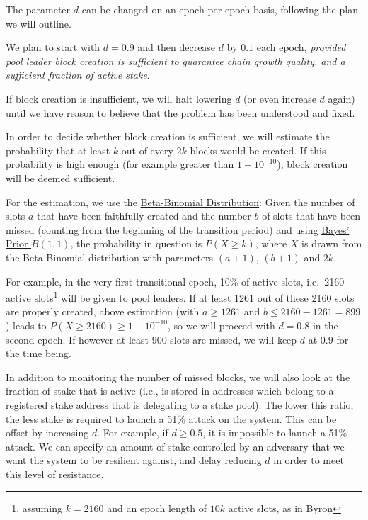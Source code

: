 \documentclass[11pt,a4paper,dvipsnames,twosided]{article}
\begin{document}
The parameter \(d\) can be changed on an epoch-per-epoch basis, following
the plan we will outline.

We plan to start with \(d=0.9\) and then decrease \(d\) by \(0.1\) each
epoch, \emph{provided pool leader block creation is sufficient to
guarantee chain growth quality, and a sufficient fraction of active
stake}.

If block creation is insufficient, we will halt lowering \(d\) (or even
increase \(d\) again) until we have reason to believe that the problem
has been understood and fixed.

In order to decide whether block creation is sufficient, we will
estimate the probability that at least \(k\) out of every \(2k\) blocks
would be created. If this probability is high enough (for example
greater than \(1 - 10^{-10}\)), block creation will be deemed
sufficient.

For the estimation, we use the
\href{https://en.wikipedia.org/wiki/Beta-binomial_distribution}{Beta-Binomial
Distribution}: Given the number of slots \(a\) that have been faithfully
created and the number \(b\) of slots that have been missed (counting
from the beginning of the transition period) and using
\href{https://en.wikipedia.org/wiki/Beta_distribution\#Bayes'_prior_probability_(Beta(1,1))}{Bayes'
Prior \(B(1,1)\)}, the probability in question is \(P(X\geq k)\),
where \(X\) is drawn from the Beta-Binomial distribution with parameters
\((a + 1)\), \((b + 1)\) and \(2k\).

For example, in the very first transitional epoch, 10\% of active slots,
i.e.~2160 active slots\footnote{assuming \(k=2160\) and an epoch length of
  \(10k\) active slots, as in Byron} will be given to pool leaders. If at least
1261 out of these 2160 slots are properly created, above estimation (with
\(a\geq 1261\) and \(b\leq 2160-1261=899\)) leads to \(P(X\geq 2160)\geq
1-10^{-10}\), so we will proceed with \(d=0.8\) in the second epoch. If however
at least 900 slots are missed, we will keep \(d\) at \(0.9\) for the time being.

In addition to monitoring the number of missed blocks, we will also look
at the fraction of stake that is active (i.e., is stored in addresses
which belong to a registered stake address that is delegating to a stake
pool). The lower this ratio, the less stake is required to launch a 51\%
attack on the system. This can be offset by increasing \(d\). For
example, if \(d \geq 0.5\), it is impossible to launch a 51\% attack. We
can specify an amount of stake controlled by an adversary that we want
the system to be resilient against, and delay reducing \(d\) in order to
meet this level of resistance.
\end{document}
